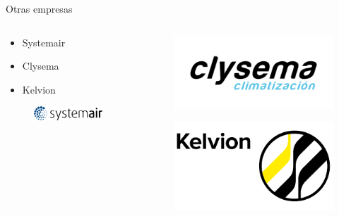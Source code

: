 \documentclass[aspectratio=169, compress]{beamer}
\begin{document}
\begin{frame}{Otras empresas}
    \begin{columns}
        \begin{column}{0.5\textwidth}
           
            \begin{itemize}
                \item Systemair
                \item Clysema
                \item Kelvion
            \end{itemize}
        
            \begin{figure}
                \begin{center}
                    \includegraphics[scale=0.7]{./figures/systemair}
                \end{center}
            \end{figure}
            
        \end{column}
        \begin{column}{0.5\textwidth}  
            
            \begin{figure}
                \begin{center}
                    \includegraphics[scale=0.35]{./figures/clysema}
                \end{center}
            \end{figure}
        
            \begin{figure}
                \begin{center}
                    \includegraphics[scale=0.35]{./figures/kelvion}
                \end{center}
            \end{figure}
        
        \end{column}
    \end{columns}
\end{frame}
\end{document}
